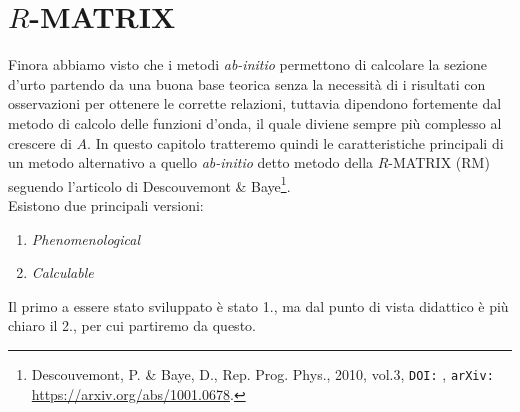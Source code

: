 \chapter{$R$-MATRIX}\label{sec-R-mat}
Finora abbiamo visto che i metodi \textit{ab-initio} permettono di calcolare la sezione d'urto partendo da una buona base teorica senza la necessità di  i risultati con osservazioni per ottenere le corrette relazioni, tuttavia dipendono fortemente dal metodo di calcolo delle funzioni d'onda, il quale diviene sempre più complesso al crescere di $A$. In questo capitolo tratteremo quindi le caratteristiche principali di un metodo alternativo a quello \textit{ab-initio} detto metodo della $R$-MATRIX (RM) seguendo l'articolo di Descouvemont \& Baye\footnote{\label{0412_art} Descouvemont, P. \& Baye, D., Rep. Prog. Phys., 2010, vol.3, \texttt{DOI:} , \texttt{arXiv:} \url{https://arxiv.org/abs/1001.0678}.}.\\ 
Esistono due principali versioni:
\begin{enumerate}
	\item \textit{Phenomenological}
	\item \textit{Calculable}
\end{enumerate}
Il primo a essere stato sviluppato è stato 1., ma dal punto di vista didattico è più chiaro il 2., per cui partiremo da questo.

